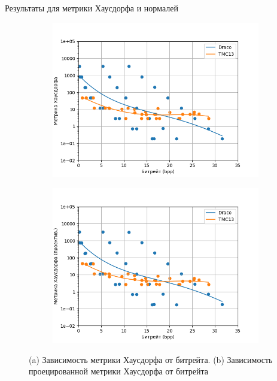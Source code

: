 \documentclass[aspectratio=169]{beamer}
\begin{document}
  \begin{frame}{Результаты для метрики Хаусдорфа и нормалей}
    \begin{figure}[H]
        \centering
        \begin{subfigure}{0.49\textwidth}
            \includegraphics[width=\linewidth]{assets/approx_h_p2pt.png}
            \caption{}
        \end{subfigure}
        \begin{subfigure}{0.49\textwidth}
            \includegraphics[width=\linewidth]{assets/approx_h_p2pl.png}
            \caption{}
        \end{subfigure}
        \caption{ (a) Зависимость метрики Хаусдорфа от битрейта. (b) Зависимость
        проецированной метрики Хаусдорфа от битрейта }
        \label{img:pcc_arena_hd}
    \end{figure}
  \end{frame}
\end{document}
